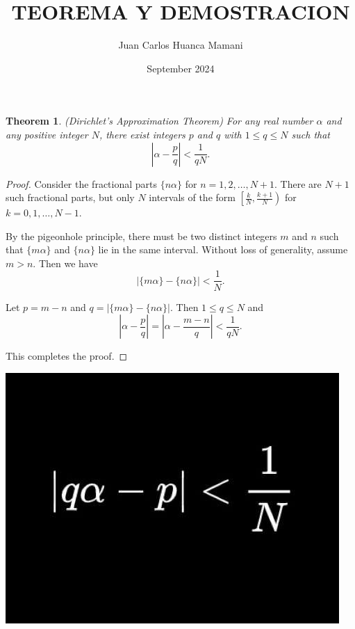 \documentclass{article}
\title{TEOREMA Y DEMOSTRACION}
\author{Juan Carlos Huanca Mamani}
\date{September 2024}
\newtheorem{theorem}{Theorem}
\begin{document}
\maketitle
\begin{theoremframe}
\begin{theorem}
  (Dirichlet's Approximation Theorem) For any real number \(\alpha\) and any positive integer \(N\), there exist integers \(p\) and \(q\) with \(1 \leq q \leq N\) such that
  \[
  \left| \alpha - \frac{p}{q} \right| < \frac{1}{qN}.
  \]
\end{theorem}
\end{theoremframe}

\begin{proofframe}
\begin{proof}
  Consider the fractional parts \(\{n\alpha\}\) for \(n = 1, 2, \ldots, N+1\). There are \(N+1\) such fractional parts, but only \(N\) intervals of the form \(\left[ \frac{k}{N}, \frac{k+1}{N} \right)\) for \(k = 0, 1, \ldots, N-1\).

  By the pigeonhole principle, there must be two distinct integers \(m\) and \(n\) such that \(\{m\alpha\}\) and \(\{n\alpha\}\) lie in the same interval. Without loss of generality, assume \(m > n\). Then we have
  \[
  \left| \{m\alpha\} - \{n\alpha\} \right| < \frac{1}{N}.
  \]

  Let \(p = m - n\) and \(q = \left| \{m\alpha\} - \{n\alpha\} \right|\). Then \(1 \leq q \leq N\) and
  \[
  \left| \alpha - \frac{p}{q} \right| = \left| \alpha - \frac{m-n}{q} \right| < \frac{1}{qN}.
  \]

  This completes the proof.
\end{proof}
\end{proofframe}


\begin{center}
    \includegraphics[scale=0.5]{teorema-de-aproximacion-de-dirichlet.jpg}
\end{center}
\end{document}
